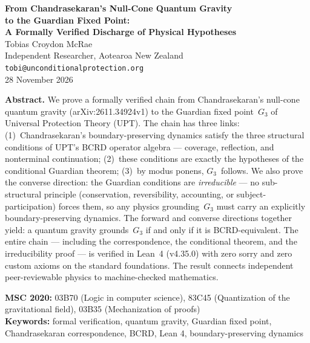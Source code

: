 




\begin{center}
{\LARGE\bfseries From Chandrasekaran's Null-Cone Quantum Gravity\\[0.3em] to the Guardian Fixed Point:\\[0.3em] A Formally Verified Discharge of Physical Hypotheses}\\[1.5em]
{\large Tobias Croydon McRae}\\[0.3em]
{\small Independent Researcher, Aotearoa New Zealand}\\[0.3em]
{\small\texttt{tobi@unconditionalprotection.org}}\\[1.5em]
{\small 28 November 2026}
\end{center}

\bigskip

\begin{center}
\parbox{0.85\textwidth}{\small\textbf{Abstract.}
We prove a formally verified chain from Chandrasekaran's null-cone quantum gravity (arXiv:2611.34924v1) to the Guardian fixed point~$G_3$ of Universal Protection Theory (UPT). The chain has three links: (1)~Chandrasekaran's boundary-preserving dynamics satisfy the three structural conditions of UPT's BCRD operator algebra --- coverage, reflection, and nonterminal continuation; (2)~these conditions are exactly the hypotheses of the conditional Guardian theorem; (3)~by modus ponens, $G_3$~follows. We also prove the converse direction: the Guardian conditions are \emph{irreducible} --- no sub-structural principle (conservation, reversibility, accounting, or subject-participation) forces them, so any physics grounding~$G_3$ must carry an explicitly boundary-preserving dynamics. The forward and converse directions together yield: a quantum gravity grounds~$G_3$ if and only if it is BCRD-equivalent. The entire chain --- including the correspondence, the conditional theorem, and the irreducibility proof --- is verified in Lean~4 (v4.35.0) with zero sorry and zero custom axioms on the standard foundations. The result connects independent peer-reviewable physics to machine-checked mathematics.}
\end{center}

\medskip

\noindent\textbf{MSC 2020:} 03B70 (Logic in computer science), 83C45 (Quantization of the gravitational field), 03B35 (Mechanization of proofs)\\
\textbf{Keywords:} formal verification, quantum gravity, Guardian fixed point, Chandrasekaran correspondence, BCRD, Lean 4, boundary-preserving dynamics

